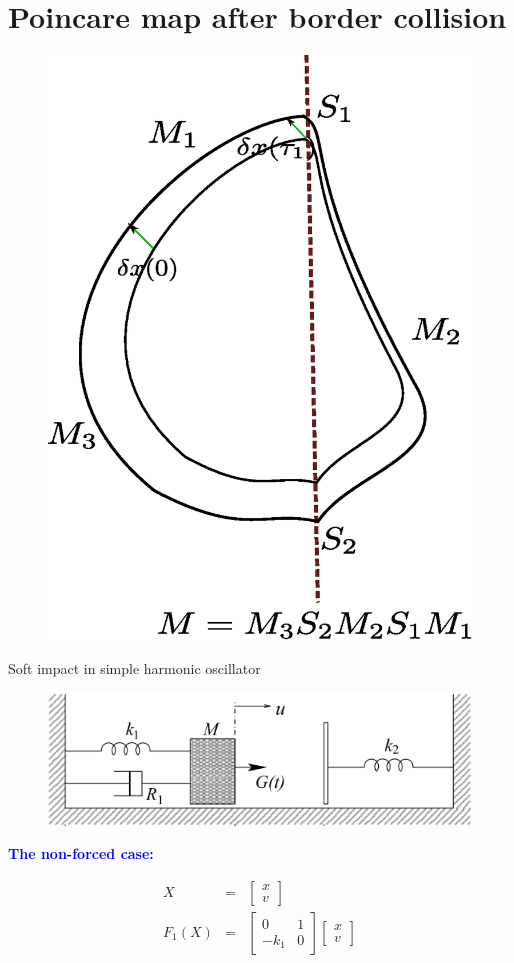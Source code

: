 \documentclass[xcolor=x11names,compress]{beamer}
\renewcommand{\(}{\begin{columns}}
\renewcommand{\)}{\end{columns}}
\newcommand{\<}[1]{\begin{column}{#1}}
\renewcommand{\>}{\end{column}}
\newcommand{\hlb}[1]{\textbf{\textcolor{blue}{#1}}}
\begin{document}
\section{Poincare map after border collision}
\begin{frame}
\begin{figure}
\begin{center}
\includegraphics[width=0.4\columnwidth]{border-c-salt}
\end{center}
\end{figure}

\end{frame}

\begin{frame}{Soft impact in simple harmonic oscillator}
\begin{figure}
\caption{}
\begin{center}
\includegraphics[width=0.6\columnwidth]{osc-pw}
\end{center}
\end{figure}

\hlb{The non-forced case:}

\begin{eqnarray}
X&=&\begin{bmatrix}
x\\v
\end{bmatrix}\\
F_1(X)&=&\begin{bmatrix}
0 & 1\\
-k_1 & 0
\end{bmatrix}
\begin{bmatrix}
x\\v
\end{bmatrix}
\end{eqnarray}
\end{frame}
\end{document}
